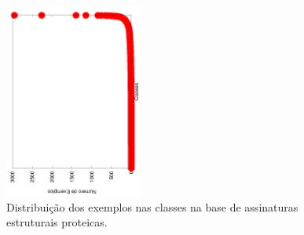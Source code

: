 






\begin{figure}[!h]
  \centering
  \includegraphics[angle=270, width=0.40\textwidth]{figures/perfil/astral.png}
 \caption{Distribuição dos exemplos nas classes na base de assinaturas estruturais proteicas.}
\label{fig::basesbio}
\end{figure}




